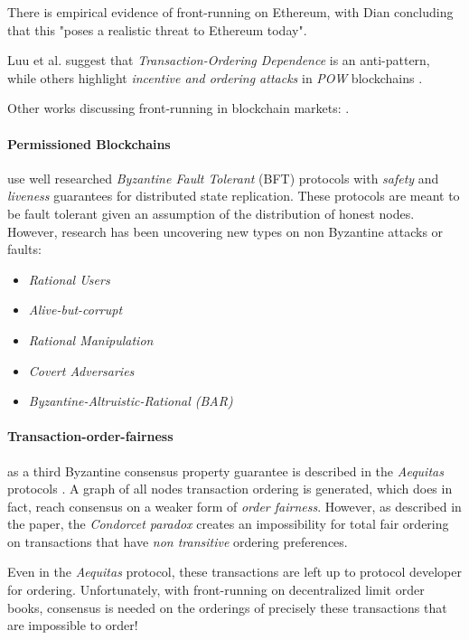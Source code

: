 \documentclass[12pt]{article}
\begin{document}
There is empirical evidence of front-running on Ethereum, with Dian concluding that this "poses a realistic threat to Ethereum today". \cite{Daian} 

Luu et al. \cite{Luu} suggest that \emph{Transaction-Ordering Dependence} is an anti-pattern, while others highlight \emph{incentive and ordering attacks} in \emph{POW} blockchains \cite{Judmayer} \cite{Delmolino}. 

Other works discussing front-running in blockchain markets: \cite{Malinova,Eskandari,Clark,Berg}.

\paragraph{Permissioned Blockchains} use well researched \emph{Byzantine Fault Tolerant} (BFT) protocols with \emph{safety} and \emph{liveness} guarantees for distributed state replication. \cite{Gueta} These protocols are meant to be fault tolerant given an assumption of the distribution of honest nodes. However, research has been uncovering new types on non Byzantine attacks or faults:      
\begin{center}
\begin{itemize}{}
  \item \emph{Rational Users} \cite{Hou}
  \item \emph{Alive-but-corrupt} \cite{Malkhi}
  \item \emph{Rational Manipulation} \cite{Shneidman}
  \item \emph{Covert Adversaries} \cite{Aumann}
  \item \emph{Byzantine-Altruistic-Rational (BAR)} \cite{Aiyer}
\end{itemize}
\end{center}

\paragraph{Transaction-order-fairness} as a third Byzantine consensus property guarantee is described in the \emph{Aequitas} protocols \cite{Kelkar_2020}. A graph of all nodes transaction ordering is generated, which does in fact, reach consensus on a weaker form of \emph{order fairness}. However, as described in the paper, the \emph{Condorcet paradox} creates an impossibility for total fair ordering on transactions that have \emph{non transitive} ordering preferences. 

Even in the \emph{Aequitas}  protocol, these transactions are left up to protocol developer for ordering. Unfortunately, with front-running on decentralized limit order books, consensus is needed on the orderings of precisely these transactions that are impossible to order! 
\end{document}
